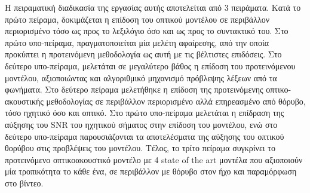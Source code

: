 Η πειραματική διαδικασία της εργασίας αυτής αποτελείται από 3 πειράματα. Κατά το πρώτο πείραμα, δοκιμάζεται η επίδοση του οπτικού μοντέλου σε περιβάλλον περιορισμένο τόσο ως προς το λεξιλόγιο όσο και ως προς το συντακτικό του. Στο πρώτο υπο-πείραμα, πραγματοποιείται μία μελέτη αφαίρεσης, από την οποία προκύπτει η προτεινόμενη μεθοδολογία ως αυτή με τις βέλτιστες επιδόσεις. Στο δεύτερο υπο-πείραμα, μελετάται σε μεγαλύτερο βάθος η επίδοση του προτεινόμενου μοντέλου, αξιοποιώντας και αλγοριθμικό μηχανισμό πρόβλεψης λέξεων από τα φωνήματα. Στο δεύτερο πείραμα μελετήθηκε η επίδοση της προτεινόμενης οπτικο-ακουστικής μεθοδολογίας σε περιβάλλον περιορισμένο αλλά επηρεασμένο από θόρυβο, τόσο ηχητικό όσο και οπτικό. Στο πρώτο υπο-πείραμα μελετάται η επίδραση της αύξησης του SNR του ηχητικού σήματος στην επίδοση του μοντέλου, ενώ στο δεύτερο υπο-πείραμα παρουσιάζονται τα αποτελέσματα της αύξησης του οπτικού θορύβου στις προβλέψεις του μοντέλου. Τέλος, το τρίτο πείραμα συγκρίνει το προτεινόμενο οπτικοακουστικό μοντέλο με 4 state of the art μοντέλα που αξιοποιούν μία τροπικότητα το κάθε ένα, σε περιβάλλον με θόρυβο στον ήχο και παραμόρφωση στο βίντεο.

\vspace*{\fill}
